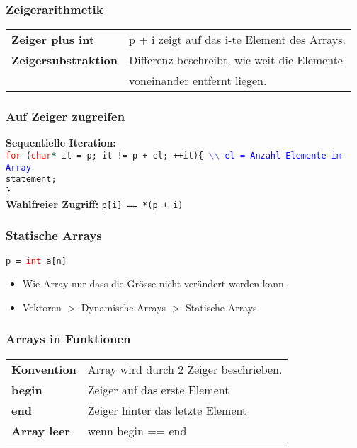 \documentclass[a3paper, 10pt, landscape]{scrartcl}
\newcommand{\code}[1]{\texttt{#1}}
\begin{document}
\begin{multicols*}{3}
	\subsubsection{Zeigerarithmetik}
	\begin{tabular}{l l}
	\textbf{Zeiger plus int} & p + i zeigt auf das i-te Element des Arrays. \\
	\textbf{Zeigersubstraktion} & Differenz beschreibt, wie weit die Elemente \\
	& voneinander entfernt liegen.
	\end{tabular}
	
	\subsubsection{Auf Zeiger zugreifen}
	\textbf{Sequentielle Iteration:} \\
	\code{\textcolor{red}{for} (\textcolor{red}{char}* it = p; it != p + el; ++it)\{ \textcolor{blue}{$\backslash$$\backslash$ el = Anzahl Elemente im Array} \\
	\phantom{for } statement; \\
	\} \\}
	\newline
	\textbf{Wahlfreier Zugriff:} \code{p[i] == *(p + i)}
	
	\subsubsection{Statische Arrays}
	\code{p = \textcolor{red}{int} a[n]}
	\begin{itemize}
		\item Wie Array nur dass die Grösse nicht verändert werden kann.
		\item Vektoren $>$ Dynamische Arrays $>$ Statische Arrays
	\end{itemize}
	
	\subsubsection{Arrays in Funktionen}
	\begin{tabular}{l l}
		\textbf{Konvention} & Array wird durch 2 Zeiger beschrieben. \\
		\textbf{begin} & Zeiger auf das erste Element \\
		\textbf{end} & Zeiger hinter das letzte Element \\
		\textbf{Array leer} & wenn begin == end \\ 
	\end{tabular}
	

\end{multicols*}
\end{document}

